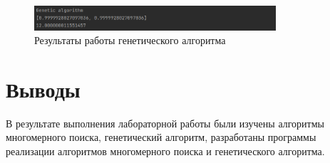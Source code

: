 \documentclass[a4paper, 14pt]{extarticle}
\begin{document}
\begin{figure}[!htb]
	\centering
	\includegraphics[width=0.8\textwidth]{img2}
\caption{Результаты работы генетического алгоритма}
\label{fig:img2}
\end{figure}

\section{Выводы}\label{Sect::conclusion}

В результате выполнения лабораторной работы были изучены алгоритмы многомерного поиска, генетический алгоритм, разработаны программы реализации алгоритмов многомерного поиска и генетического алгоритма.
\end{document}
